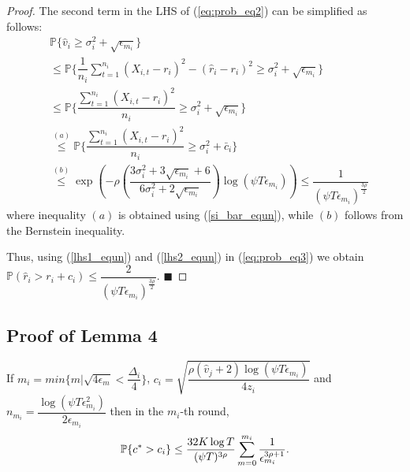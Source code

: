 \begin{proof}
 
The second term in the LHS of (\ref{eq:prob_eq2}) can be simplified as follows:
\begin{align}
&\mathbb{P}\bigg\lbrace \hat{v}_{i}\geq \sigma_{i}^{2}+\sqrt{\epsilon_{m_{i}}}\bigg\rbrace\nonumber\\
&\leq \mathbb{P}\bigg\lbrace \dfrac{1}{n_{i}}\sum_{t=1}^{n_{i}}(X_{i,t}-r_{i})^{2}-(\hat{r}_{i}-r_{i})^{2}\geq \sigma_{i}^{2}+\sqrt{\epsilon_{m_{i}}}\bigg\rbrace\nonumber\\
&\leq \mathbb{P}\bigg\lbrace \dfrac{\sum_{t=1}^{n_{i}}(X_{i,t}-r_{i})^{2}}{n_{i}}\geq \sigma_{i}^{2}+\sqrt{\epsilon_{m_{i}}} \bigg\rbrace\nonumber\\
&\overset{(a)}{\leq} \mathbb{P}\bigg\lbrace \dfrac{\sum_{t=1}^{n_{i}}(X_{i,t}-r_{i})^{2}}{n_{i}}\geq \sigma_{i}^{2} + \bar{c}_i\bigg\rbrace \nonumber\\
&\overset{(b)}{\leq} \exp\left(- \rho \left(\dfrac{3\sigma_{i}^{2}+3\sqrt{\epsilon_{m_{i}}} + 6}{6\sigma_i^2 + 2\sqrt{\epsilon_{m_i}}} \right)\log(\psi  T\epsilon_{m_{i}})\right)
\le \dfrac{1}{(\psi  T\epsilon_{m_{i}})^{\frac{3\rho}{2}}}
\label{lhs2_equn}
\end{align}
where inequality $(a)$ is obtained using (\ref{si_bar_equn}), while $(b)$ follows from the Bernstein inequality. 

Thus, using (\ref{lhs1_equn}) and (\ref{lhs2_equn}) in (\ref{eq:prob_eq3}) we obtain $\mathbb{P}(\hat{r}_{i}> r_{i} + c_{i})\le \dfrac{2}{(\psi  T\epsilon_{m_{i}})^{\frac{3\rho}{2}}}$.
\hfill $\blacksquare$	
\end{proof}


\subsection{Proof of Lemma 4}
\label{App:Lemma:4}
\begin{lemma}
If $m_i = min\lbrace m|\sqrt{4\epsilon_{m} } < \dfrac{\Delta_i}{4} \rbrace $, $c_{i} =\sqrt{\dfrac{\rho(\hat{v}_j + 2)\log (\psi T\epsilon_{m_{i}})}{4 z_{i}}}$ and $n_{m_i}=\dfrac{\log{(\psi T\epsilon_{m_{i}}^{2})}}{2\epsilon_{m_{i}}}$ then in the $m_i$-th round, 
\begin{align*}
\mathbb{P}\lbrace c^{*} > c_i \rbrace \leq \dfrac{32K\log T}{(\psi T)^{3\rho}}\sum_{m=0}^{m_i}\dfrac{1}{\epsilon_{m_i}^{3\rho + 1}}. 
\end{align*}
\end{lemma}

